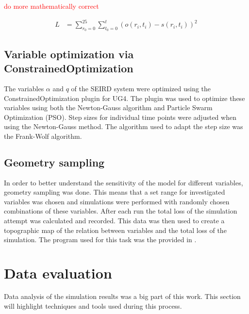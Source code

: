 \textcolor{red}{do more mathematically correct}

\begin{align}
	L &= \sum_{r_0=0}^{25} \sum_{t_{0}=0}^{t} (o(r_i,t_i) - s(r_i,t_i))^{2}
	\label{eq:loss_newton}
\end{align}


\subsection{Variable optimization via ConstrainedOptimization}
The variables $\alpha$ and $q$ of the SEIRD system were optimized using the ConstrainedOptimization plugin for UG4\cite{???}.
The plugin was used to optimize these variables using both the Newton-Gauss algorithm and Particle Swarm Optimization (PSO). Step sizes for
individual time points were adjusted when using the Newton-Gauss method. The algorithm used to adapt the step size was the Frank-Wolf
algorithm\cite{devansh}\cite{frank-wolf}. %


\subsection{Geometry sampling}
In order to better understand the sensitivity of the model for different variables, geometry sampling was done. This means that a set range for
investigated variables was chosen and simulations were performed with randomly chosen combinations of these variables. After each run the total
loss of the simulation attempt was calculated and recorded. This data was then used to create a topographic map of the relation between variables
and the total loss of the simulation. The program used for this task was the  provided in .



\section{Data evaluation}
Data analysis of the simulation results was a big part of this work. This section will highlight techniques and tools used during this process.

